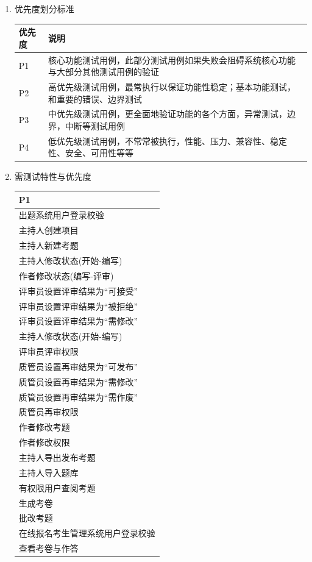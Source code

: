 \documentclass[hyperref, a4paper]{ctexart}
\providecommand{\tightlist}{%
  \setlength{\itemsep}{0pt}\setlength{\parskip}{0pt}}
\begin{document}
\begin{enumerate}
\def\labelenumi{\arabic{enumi}.}
\tightlist
\item
  优先度划分标准

  \begin{tabular}{|p{2cm}|p{8cm}|}
  \hline
  优先度 & 说明\\
  \hline
  P1 & 核心功能测试用例，此部分测试用例如果失败会阻碍系统核心功能与大部分其他测试用例的验证\\
  \hline
  P2 & 高优先级测试用例，最常执行以保证功能性稳定；基本功能测试，和重要的错误、边界测试\\
  \hline
  P3 & 中优先级测试用例，更全面地验证功能的各个方面，异常测试，边界，中断等测试用例\\
  \hline
  P4 & 低优先级测试用例，不常常被执行，性能、压力、兼容性、稳定性、安全、可用性等等\\
  \hline
  \end{tabular}
\item
  需测试特性与优先度

  \begin{tabular}{|p{10cm}|}
  \hline
  P1\\
  \hline
  出题系统用户登录校验\\
  \hline
  主持人创建项目\\
  \hline
  主持人新建考题\\
  \hline
  主持人修改状态(开始-编写)\\
  \hline
  作者修改状态(编写-评审) \\
  \hline
  评审员设置评审结果为“可接受” \\
  \hline
  评审员设置评审结果为“被拒绝”\\
  \hline
  评审员设置评审结果为“需修改” \\
  \hline
  主持人修改状态(开始-编写)\\
  \hline
  评审员评审权限\\
  \hline
  质管员设置再审结果为“可发布” \\
  \hline
  质管员设置再审结果为“需修改” \\
  \hline
  质管员设置再审结果为“需作废”\\
  \hline
  质管员再审权限\\
  \hline
  作者修改考题\\
  \hline
  作者修改权限\\
  \hline
  主持人导出发布考题\\
  \hline
  主持人导入题库\\
  \hline
  有权限用户查阅考题\\
  \hline
  生成考卷\\
  \hline
  批改考题\\
  \hline
  在线报名考生管理系统用户登录校验\\
  \hline
  查看考卷与作答\\
  \hline
  \end{tabular}
\end{enumerate}
\end{document}
